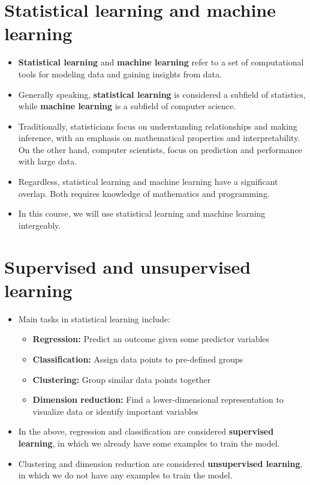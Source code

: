 \documentclass[
  letterpaper,
  DIV=11,
  numbers=noendperiod]{scrreprt}
\providecommand{\tightlist}{%
  \setlength{\itemsep}{0pt}\setlength{\parskip}{0pt}}\usepackage{longtable,booktabs,array}
\begin{document}
\section{Statistical learning and machine
learning}\label{statistical-learning-and-machine-learning}

\begin{itemize}
\item
  \textbf{Statistical learning} and \textbf{machine learning} refer to a
  set of computational tools for modeling data and gaining insights from
  data.
\item
  Generally speaking, \textbf{statistical learning} is considered a
  subfield of statistics, while \textbf{machine learning} is a subfield
  of computer science.
\item
  Traditionally, statisticians focus on understanding relationships and
  making inference, with an emphasis on mathematical properties and
  interpretability. On the other hand, computer scientists, focus on
  prediction and performance with large data.
\item
  Regardless, statistical learning and machine learning have a
  significant overlap. Both requires knowledge of mathematics and
  programming.
\item
  In this course, we will use statistical learning and machine learning
  intergeably.
\end{itemize}

\section{Supervised and unsupervised
learning}\label{supervised-and-unsupervised-learning}

\begin{itemize}
\item
  Main tasks in statistical learning include:

  \begin{itemize}
  \tightlist
  \item
    \textbf{Regression:} Predict an outcome given some predictor
    variables
  \item
    \textbf{Classification:} Assign data points to pre-defined groups
  \item
    \textbf{Clustering:} Group similar data points together
  \item
    \textbf{Dimension reduction:} Find a lower-dimensional
    representation to visualize data or identify important variables
  \end{itemize}
\item
  In the above, regression and classification are considered
  \textbf{supervised learning}, in which we already have some examples
  to train the model.
\item
  Clustering and dimension reduction are considered \textbf{unsupervised
  learning}, in which we do not have any examples to train the model.
\end{itemize}
\end{document}
